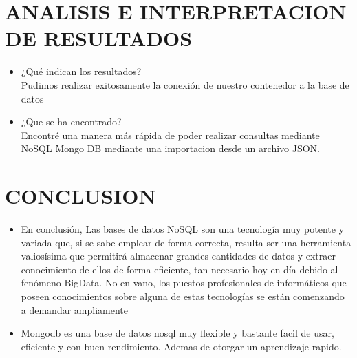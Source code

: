 \documentclass[preprint,12pt]{elsarticle}
\begin{document}
\section{ANALISIS E INTERPRETACION DE RESULTADOS }
\begin{itemize}
	\item ¿Qué indican los resultados? \\
	Pudimos realizar exitosamente la conexión de nuestro contenedor a la base de datos
	\item ¿Que se ha encontrado?\\
	Encontré una manera más rápida de poder realizar consultas mediante NoSQL Mongo DB mediante una importacion desde un archivo JSON.
\end{itemize}


\section{CONCLUSION}
\begin{itemize}
\item En conclusión, Las bases de datos NoSQL son una tecnología muy potente y variada que, si se sabe
emplear de forma correcta, resulta ser una herramienta valiosísima que permitirá
almacenar grandes cantidades de datos y extraer conocimiento de ellos de forma
eficiente, tan necesario hoy en día debido al fenómeno BigData. No en vano, los puestos
profesionales de informáticos que poseen conocimientos sobre alguna de estas
tecnologías se están comenzando a demandar ampliamente

\item Mongodb es una base de datos nosql muy flexible y bastante facil de usar, eficiente y con buen rendimiento. Ademas de otorgar un aprendizaje rapido.
\end{itemize}
\end{document}
